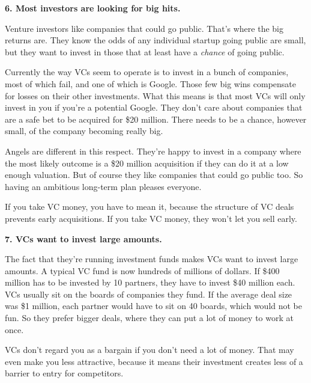 \textbf{6. Most investors are looking for big hits.}

Venture investors like companies that could go
                  public. That's where the big returns are. They know the odds
                  of any individual startup going public are small, but they
                  want to invest in those that at least have a \emph{chance} of
                  going public.

Currently the way VCs seem to operate
                  is to invest in a bunch of companies, most of which fail, and
                  one of which is Google. Those few big wins compensate for
                  losses on their other investments. What this means is that
                  most VCs will only invest in you if you're a potential Google.
                  They don't care about companies that are a safe bet to be
                  acquired for \$20 million. There needs to be a chance, however
                  small, of the company becoming really big.

Angels
                  are different in this respect. They're happy to invest in a
                  company where the most likely outcome is a \$20 million
                  acquisition if they can do it at a low enough valuation. But
                  of course they like companies that could go public too. So
                  having an ambitious long-term plan pleases everyone.

If
                  you take VC money, you have to mean it, because the structure
                  of VC deals prevents early acquisitions. If you take VC money,
                  they won't let you sell early.

\textbf{7. VCs want to invest large amounts.}

The fact that they're running investment funds
                  makes VCs want to invest large amounts. A typical VC fund is
                  now hundreds of millions of dollars. If \$400 million has to be
                  invested by 10 partners, they have to invest \$40 million each.
                  VCs usually sit on the boards of companies they fund. If the
                  average deal size was \$1 million, each partner would have to
                  sit on 40 boards, which would not be fun. So they prefer
                  bigger deals, where they can put a lot of money to work at
                  once.

VCs don't regard you as a bargain if you
                  don't need a lot of money. That may even make you less
                  attractive, because it means their investment creates less of
                  a barrier to entry for competitors.

